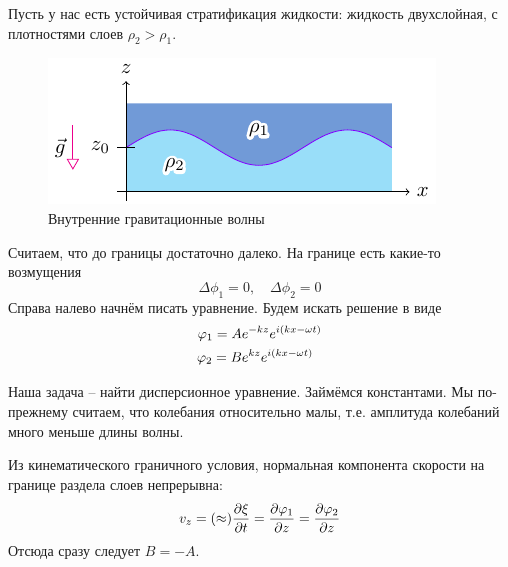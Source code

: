 


Пусть у нас есть устойчивая стратификация жидкости: жидкость двухслойная, с плотностями слоев $\rho_2>\rho_1$.
\begin{figure}[H]
    \centering
    \includegraphics[scale=1.5]{img/vnutr}
    \caption{Внутренние гравитационные волны}
    \label{fig:vnutr}
\end{figure}
Считаем, что до границы достаточно далеко.
На границе есть какие-то возмущения
\begin{equation}
    \Delta\phi_1 = 0, \quad \Delta\phi_2 = 0
\end{equation}
Справа налево начнём писать уравнение.
Будем искать решение в виде
\begin{gather}
    \phi_1 = A e^{-kz} e^{i(kx-\omega t)}\\
    \phi_2 = B e^{kz} e^{i(kx-\omega t)}\hphantom{^{-}}
\end{gather}

Наша задача -- найти дисперсионное уравнение. Займёмся константами. Мы по-прежнему считаем, что колебания относительно малы,
т.е. амплитуда колебаний много меньше длины волны.

Из кинематического граничного условия, нормальная компонента скорости на границе раздела слоев непрерывна:
\begin{equation}
    v_z = (\approx) \pdv{\xi}{t} = \pdv{\varphi_1}{z} = \pdv{\varphi_2}{z}
\end{equation}
Отсюда сразу следует $B = -A$.

